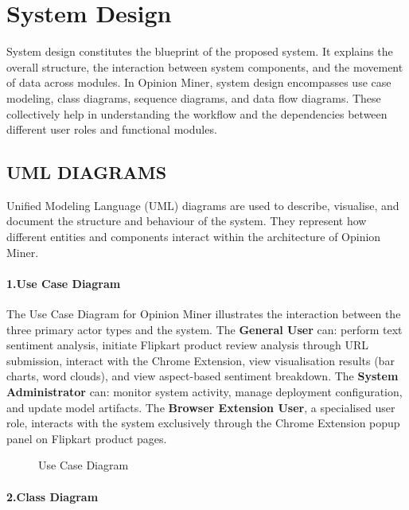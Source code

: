 \documentclass[12pt,a4paper]{report}
\begin{document}
\chapter{System Design}

System design constitutes the blueprint of the proposed system. It explains the overall structure, the interaction between system components, and the movement of data across modules. In Opinion Miner, system design encompasses use case modeling, class diagrams, sequence diagrams, and data flow diagrams. These collectively help in understanding the workflow and the dependencies between different user roles and functional modules.

\section{UML DIAGRAMS}

Unified Modeling Language (UML) diagrams are used to describe, visualise, and document the structure and behaviour of the system. They represent how different entities and components interact within the architecture of Opinion Miner.

\subsubsection*{1.\quad Use Case Diagram}

The Use Case Diagram for Opinion Miner illustrates the interaction between the three primary actor types and the system. The \textbf{General User} can: perform text sentiment analysis, initiate Flipkart product review analysis through URL submission, interact with the Chrome Extension, view visualisation results (bar charts, word clouds), and view aspect-based sentiment breakdown. The \textbf{System Administrator} can: monitor system activity, manage deployment configuration, and update model artifacts. The \textbf{Browser Extension User}, a specialised user role, interacts with the system exclusively through the Chrome Extension popup panel on Flipkart product pages.

\begin{figure}[H]
\centering
{}
\caption{Use Case Diagram}
\label{fig:usecase}
\end{figure}

\subsubsection*{2.\quad Class Diagram}
\end{document}
